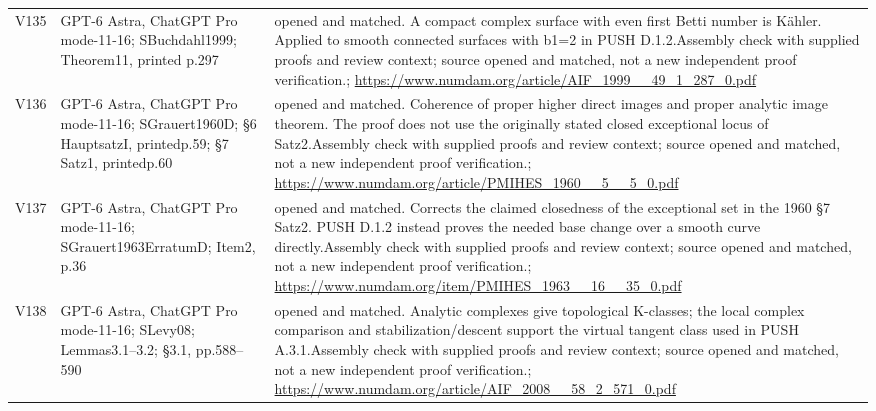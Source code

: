 \begin{longtable}{@{}L{.08\linewidth}L{.31\linewidth}L{.56\linewidth}@{}}
V135 & GPT-6 Astra, ChatGPT Pro mode-11-16; S\newline Buchdahl1999; Theorem11, printed p.297 & opened and matched. A compact complex surface with even first Betti number is Kähler. Applied to smooth connected surfaces with b1=2 in PUSH D.1.2.\newline Assembly check with supplied proofs and review context; source opened and matched, not a new independent proof verification.\newline {}; \url{https://www.numdam.org/article/AIF_1999__49_1_287_0.pdf}\\
V136 & GPT-6 Astra, ChatGPT Pro mode-11-16; S\newline Grauert1960D; §6 HauptsatzI, printedp.59; §7 Satz1, printedp.60 & opened and matched. Coherence of proper higher direct images and proper analytic image theorem. The proof does not use the originally stated closed exceptional locus of Satz2.\newline Assembly check with supplied proofs and review context; source opened and matched, not a new independent proof verification.\newline {}; \url{https://www.numdam.org/article/PMIHES_1960__5__5_0.pdf}\\
V137 & GPT-6 Astra, ChatGPT Pro mode-11-16; S\newline Grauert1963ErratumD; Item2, p.36 & opened and matched. Corrects the claimed closedness of the exceptional set in the 1960 §7 Satz2. PUSH D.1.2 instead proves the needed base change over a smooth curve directly.\newline Assembly check with supplied proofs and review context; source opened and matched, not a new independent proof verification.\newline {}; \url{https://www.numdam.org/item/PMIHES_1963__16__35_0.pdf}\\
V138 & GPT-6 Astra, ChatGPT Pro mode-11-16; S\newline Levy08; Lemmas3.1--3.2; §3.1, pp.588--590 & opened and matched. Analytic complexes give topological K-classes; the local complex comparison and stabilization/\allowbreak{}descent support the virtual tangent class used in PUSH A.3.1.\newline Assembly check with supplied proofs and review context; source opened and matched, not a new independent proof verification.\newline {}; \url{https://www.numdam.org/article/AIF_2008__58_2_571_0.pdf}\\

\end{longtable}
